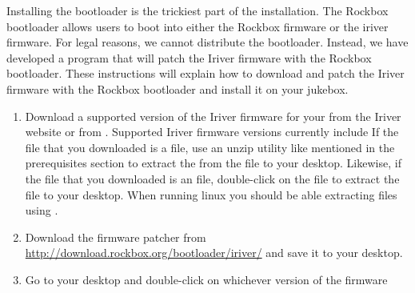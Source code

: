 
  Installing the bootloader is the trickiest part of the installation.
  The Rockbox bootloader allows users to boot into either the Rockbox 
  firmware or the iriver firmware. For legal reasons, we cannot distribute 
  the bootloader. Instead, we have developed a program that will patch the 
  Iriver firmware with the Rockbox bootloader. These instructions will explain 
  how to download and patch the Iriver firmware with the Rockbox bootloader 
  and install it on your jukebox.


\begin{enumerate}
  \item Download a supported version of the Iriver firmware for your 
  \playername{} from the Iriver website or from 
  .
  Supported Iriver firmware versions currently include 
  If the file that you downloaded is a  file, use an unzip 
  utility like mentioned in the prerequisites section to extract
  the  from the  file
  to your desktop. Likewise, if the file that you downloaded is an 
   file, double-click on the  file to extract 
  the  file to your desktop.
  When running linux you should be able extracting 
  files using .
  \item Download the firmware patcher  from 
  \url{http://download.rockbox.org/bootloader/iriver/} and save it to your desktop.
  \item Go to your desktop and double-click on whichever version of the firmware 

\end{enumerate}
